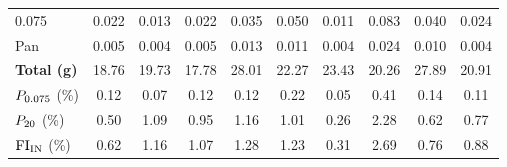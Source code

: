 \begin{table}[htbp]
\begin{tabular}{@{}l*{9}{S[table-format=2.3]}@{}}
    0.075 & 0.022 & 0.013 & 0.022 & 0.035 & 0.050 & 0.011 & 0.083 & 0.040 & 0.024\\
    Pan   & 0.005 & 0.004 & 0.005 & 0.013 & 0.011 & 0.004 & 0.024 & 0.010 & 0.004\\
    \midrule
    {\textbf{Total (g)}} & 18.76 & 19.73 & 17.78 & 28.01 & 22.27 & 23.43 & 20.26 & 27.89 & 20.91\\
    {$P_{0.075}$ (\%)} & 0.12 & 0.07 & 0.12 & 0.12 & 0.22 & 0.05 & 0.41 & 0.14 & 0.11\\
    {$P_{20}$ (\%)}    & 0.50 & 1.09 & 0.95 & 1.16 & 1.01 & 0.26 & 2.28 & 0.62 & 0.77\\
    {$\mathrm{FI}_{\mathrm{IN}}$ (\%)}         & 0.62 & 1.16 & 1.07 & 1.28 & 1.23 & 0.31 & 2.69 & 0.76 & 0.88\\
    \bottomrule
  \end{tabular}
\end{table}
